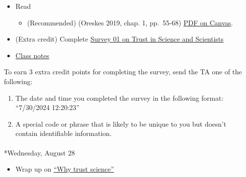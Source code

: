 \documentclass[
  letterpaper,
  DIV=11,
  numbers=noendperiod]{scrartcl}
\makeatletter
\let\oldparagraph\paragraph
\renewcommand{\paragraph}{
    \@ifstar
      \xxxParagraphStar
      \xxxParagraphNoStar
  }
\newcommand{\xxxParagraphStar}[1]{\oldparagraph*{#1}\mbox{}}
\newcommand{\xxxParagraphNoStar}[1]{\oldparagraph{#1}\mbox{}}
\providecommand{\tightlist}{%
  \setlength{\itemsep}{0pt}\setlength{\parskip}{0pt}}\usepackage{longtable,booktabs,array}
\makeatother
\begin{document}
\begin{itemize}
\tightlist
\item
  Read

  \begin{itemize}
  \tightlist
  \item
    (Recommended) (Oreskes 2019, chap. 1, pp.~55-68) \textbar{}
    \href{https://psu.instructure.com/courses/2350148/files/folder/readings?preview=165170717}{PDF
    on Canvas}.
  \end{itemize}
\item
  (Extra credit) Complete
  \href{https://forms.gle/471gpq6XXXq9iG9C8}{Survey 01 on Trust in
  Science and Scientists}
\item
  \href{notes/wk01-2024-08-26-intro.qmd}{Class notes}
\end{itemize}

\begin{tcolorbox}[enhanced jigsaw, left=2mm, leftrule=.75mm, title=\textcolor{quarto-callout-tip-color}{\faLightbulb}\hspace{0.5em}{Tip}, coltitle=black, rightrule=.15mm, arc=.35mm, toprule=.15mm, colbacktitle=quarto-callout-tip-color!10!white, toptitle=1mm, colframe=quarto-callout-tip-color-frame, breakable, bottomtitle=1mm, opacityback=0, bottomrule=.15mm, titlerule=0mm, opacitybacktitle=0.6, colback=white]

To earn 3 extra credit points for completing the survey, send the TA one
of the following:

\begin{enumerate}
\def\labelenumi{\arabic{enumi}.}
\tightlist
\item
  The date and time you completed the survey in the following format:
  ``7/30/2024 12:20:23''
\item
  A special code or phrase that is likely to be unique to you but
  doesn't contain identifiable information.
\end{enumerate}

\end{tcolorbox}

\paragraph*{Wednesday, August 28}\label{wednesday-august-28}

\begin{itemize}
\tightlist
\item
  Wrap up on
  \href{notes/wk01-2024-08-26-intro.qmd\#trust-in-science}{``Why trust
  science''}
\end{itemize}
\end{document}
